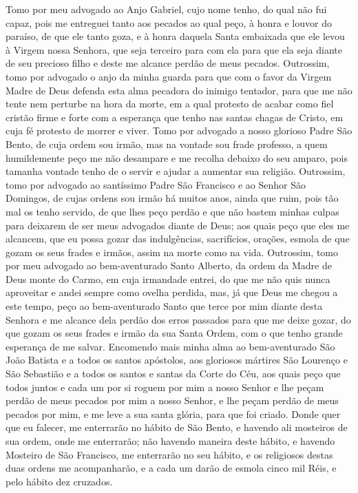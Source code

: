 Tomo por meu advogado ao Anjo Gabriel, cujo nome tenho, do qual não fui
capaz, pois me entreguei tanto aos pecados ao qual peço, à honra e
louvor do paraíso, de que ele tanto goza, e à honra daquela Santa
embaixada que ele levou à Virgem nossa Senhora, que seja terceiro para
com ela para que ela seja diante de seu precioso filho e deste me
alcance perdão de meus pecados. Outrossim, tomo por advogado o anjo da
minha guarda para que com o favor da Virgem Madre de Deus defenda esta
alma pecadora do inimigo tentador, para que me não tente nem perturbe
na hora da morte, em a qual protesto de acabar como fiel cristão firme
e forte com a esperança que tenho nas santas chagas de Cristo, em cuja
fé protesto de morrer e viver. Tomo por advogado a nosso glorioso Padre
São Bento, de cuja ordem sou irmão, mas na vontade sou frade professo,
a quem humildemente peço me não desampare e me recolha debaixo do seu
amparo, pois tamanha vontade tenho de o servir e ajudar a aumentar sua
religião. Outrossim, tomo por advogado ao santíssimo Padre São
Francisco e ao Senhor São Domingos, de cujas ordens sou irmão há muitos
anos, ainda que ruim, pois tão mal os tenho servido, de que lhes peço
perdão e que não bastem minhas culpas para deixarem de ser meus
advogados diante de Deus; aos quais peço que eles me alcancem, que eu
possa gozar das indulgências, sacrifícios, orações, esmola de que gozam
os seus frades e irmãos, assim na morte como na vida. Outrossim, tomo
por meu advogado ao bem-aventurado Santo Alberto, da ordem da Madre de
Deus monte do Carmo, em cuja irmandade entrei, do que me não quis nunca
aproveitar e andei sempre como ovelha perdida, mas, já que Deus me
chegou a este tempo, peço ao bem-aventurado Santo que terce por mim 
diante desta Senhora e me alcance dela perdão dos erros passados para
que me deixe gozar, do que gozam os seus frades e irmão da sua Santa
Ordem, com o que tenho grande esperança de me salvar. Encomendo mais
minha alma ao bem-aventurado São João Batista e a todos os santos
apóstolos, aos gloriosos mártires São Lourenço e São Sebastião e a
todos os santos e santas da Corte do Céu, aos quais peço que todos
juntos e cada um por si roguem por mim a nosso Senhor e lhe peçam
perdão de meus pecados por mim a nosso Senhor, e lhe peçam perdão de
meus pecados por mim, e me leve a sua santa glória, para que foi
criado. Donde quer que eu falecer, me enterrarão no hábito de São
Bento, e havendo ali mosteiros de sua ordem, onde me enterrarão; não
havendo maneira deste hábito, e havendo Mosteiro de São Francisco, me
enterrarão no seu hábito, e os religiosos destas duas ordens me
acompanharão, e a cada um darão de esmola cinco mil Réis, e pelo hábito
dez cruzados. 

